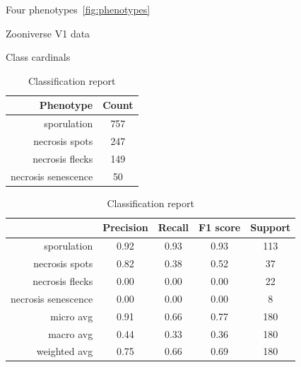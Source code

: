 \documentclass[english]{article}
\begin{document}
Four phenotypes~\ref*{fig:phenotypes}

\begin{table}[H]
	\caption{Zooniverse V1 data}\label{tab:zv1data}
	\begin{minipage}{0.4\linewidth}
		\caption{Class cardinals}\label{tab:zoonv1classcardinals}
		\begin{tabular}{rc}
			\toprule
			Phenotype           & Count \\
			\midrule
			sporulation         & 757   \\
			necrosis spots       & 247   \\
			necrosis flecks     & 149   \\
			necrosis senescence & 50    \\
			\bottomrule
		\end{tabular}
	\end{minipage}%
	\begin{minipage}{0.4\linewidth}
		\centering
		\caption{Classification report}\label{tab:zv1mcr}
		\begin{tabular}{rcccc}
			\toprule
			{}                                    & Precision & Recall & F1 score & Support \\
			\midrule
			sporulation                           & 0.92      & 0.93   & 0.93     & 113     \\
			necrosis spots                         & 0.82      & 0.38   & 0.52     & 37      \\
			\rowcolor{red!25} necrosis flecks     & 0.00      & 0.00   & 0.00     & 22      \\
			\rowcolor{red!25} necrosis senescence & 0.00      & 0.00   & 0.00     & 8       \\
			micro avg                             & 0.91      & 0.66   & 0.77     & 180     \\
			macro avg                             & 0.44      & 0.33   & 0.36     & 180     \\
			weighted avg                          & 0.75      & 0.66   & 0.69     & 180     \\
			\bottomrule
		\end{tabular}
	\end{minipage}
\end{table}
\end{document}
